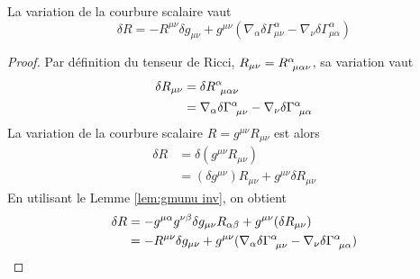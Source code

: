 \begin{theoremframe}
    \begin{propri}
        La variation de la courbure scalaire vaut
        \begin{equation}
            \label{eq:valeur de delta R}
            \boxed{\delta R = -R^{\mu \nu}\delta g_{\mu \nu} + g^{\mu \nu}(\nabla_{\alpha}\delta\Gamma^{\alpha}_{\mu \nu} - \nabla_{\nu} \delta \Gamma^{\alpha}_{\mu \alpha})}
        \end{equation}
    \end{propri}
\end{theoremframe}
\begin{proof}
    Par définition du tenseur de Ricci, $R_{\mu \nu} = R\indices{^{\alpha}_{\!\mu \alpha \nu}}$, sa variation vaut
    \begin{align}
        \delta R_{\mu \nu} &= \delta R\indices{^{\alpha}_{\!\mu \alpha \nu}}\\
        &= \nabla_{\alpha}\delta\Gamma\indices{^{\alpha}_{\!\mu \nu}} - \nabla_{\nu} \delta \Gamma\indices{^{\alpha}_{\!\mu \alpha}}
    \end{align}
    La variation de la courbure scalaire $ R= g^{\mu \nu}R_{\mu \nu}$ est alors
    \begin{align}
        \delta R &= \delta (g^{\mu \nu}R_{\mu \nu})\\
        &= (\delta g^{\mu \nu})R_{\mu \nu} + g^{\mu \nu}\delta R_{\mu \nu}
        \label{eq:variation de R}
    \end{align}
    En utilisant le Lemme \ref{lem:gmunu inv}, on obtient
    \begin{align}
        \delta R &= -g^{\mu \alpha}g^{\nu \beta} \delta g_{\mu \nu}R_{\alpha \beta} + g^{\mu \nu}(\delta R_{\mu \nu})\\
        &= -R^{\mu \nu}\delta g_{\mu \nu} + g^{\mu \nu}(\nabla_{\alpha}\delta\Gamma\indices{^{\alpha}_{\!\mu \nu}} - \nabla_{\nu} \delta \Gamma\indices{^{\alpha}_{\!\mu \alpha}})
    \end{align}
\end{proof}
